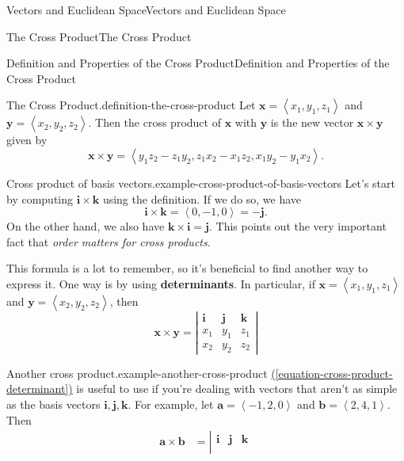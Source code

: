 \documentclass[10pt,]{book}
\newcommand{\terminology}[1]{\textbf{#1}}
\numberwithin{equation}{section}
\newcommand{\vv}[1]{\mathbf{#1}}
\newcommand{\dotprod}[1]{\left\langle #1 \right\rangle}
\begin{document}
\begin{chapterptx}{Vectors and Euclidean Space}{}{Vectors and Euclidean Space}{}{}
\begin{sectionptx}{The Cross Product}{}{The Cross Product}{}{}
\begin{subsectionptx}{Definition and Properties of the Cross Product}{}{Definition and Properties of the Cross Product}{}{}
\begin{definition}{The Cross Product.}{definition-the-cross-product}%
\hypertarget{p-949}{}%
Let \(\vv{x} = \dotprod{x_{1},y_{1},z_{1}}\) and \(\vv{y} = \dotprod{x_{2},y_{2},z_{2}}\). Then the cross product of \(\vv{x}\) with \(\vv{y}\) is the new vector \(\vv{x}\times\vv{y}\) given by%
%
\begin{equation*}
\vv{x}\times\vv{y} = \dotprod{y_{1}z_{2}-z_{1}y_{2}, z_{1}x_{2}-x_{1}z_{2}, x_{1}y_{2} - y_{1}x_{2}}.
\end{equation*}
\end{definition}
\begin{example}{Cross product of basis vectors.}{example-cross-product-of-basis-vectors}%
\hypertarget{p-950}{}%
Let's start by computing \(\vv{i}\times\vv{k}\) using the definition. If we do so, we have%
%
\begin{equation*}
\vv{i}\times\vv{k} = \dotprod{0,-1,0} = -\vv{j}.
\end{equation*}
\hypertarget{p-951}{}%
On the other hand, we also have \(\vv{k}\times\vv{i} = \vv{j}\). This points out the very important fact that \emph{order matters for cross products}.%
\end{example}
\hypertarget{p-952}{}%
This formula is a lot to remember, so it's beneficial to find another way to express it. One way is by using \terminology{determinants}. In particular, if \(\vv{x} = \dotprod{x_{1},y_{1},z_{1}}\) and \(\vv{y} = \dotprod{x_{2},y_{2},z_{2}}\), then%
%
\begin{equation}
\vv{x}\times\vv{y} = \left|\begin{array}{ccc}
\vv{i} & \vv{j} & \vv{k} \\ x_{1} & y_{1} & z_{1} \\ x_{2} & y_{2} & z_{2} \end{array}\right|\label{equation-cross-product-determinant}
\end{equation}
\begin{example}{Another cross product.}{example-another-cross-product}%
\hypertarget{p-953}{}%
\hyperref[equation-cross-product-determinant]{(\ref{equation-cross-product-determinant})} is useful to use if you're dealing with vectors that aren't as simple as the basis vectors \(\vv{i},\vv{j},\vv{k}\). For example, let \(\vv{a} = \dotprod{-1,2,0}\) and \(\vv{b} = \dotprod{2,4,1}\). Then%
%
\begin{align*}
\vv{a}\times\vv{b} & = \left|\begin{array}{ccc}
\vv{i} & \vv{j} & \vv{k} \\

\end{array}
\end{align*}
\end{example}
\end{subsectionptx}
\end{sectionptx}
\end{chapterptx}
\end{document}
